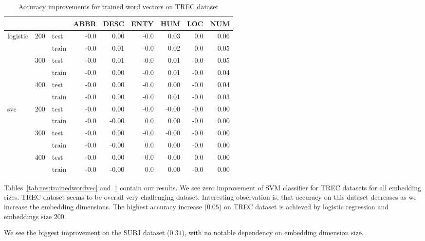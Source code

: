     \begin{table}[H]
    \begin{center}
    
    \begin{tabular}{lllrrrrrr}
    \toprule
     & &&ABBR &DESC &ENTY &HUM &LOC &NUM \\
    \midrule
    logistic & 200 & test &-0.0 &0.00 &-0.0 & 0.03 &0.0 & 0.06 \\
     & & train &-0.0 &0.01 &-0.0 & 0.02 &0.0 & 0.05 \\
     & 300 & test &-0.0 &0.01 &-0.0 & 0.01 & -0.0 & 0.05 \\
     & & train &-0.0 &0.00 &-0.0 & 0.01 & -0.0 & 0.04 \\
     & 400 & test &-0.0 &0.00 &-0.0 & 0.00 & -0.0 & 0.04 \\
     & & train &-0.0 &0.00 &-0.0 & 0.01 & -0.0 & 0.03 \\
    svc & 200 & test &-0.0 &0.00 &-0.0 &-0.00 & -0.0 & 0.00 \\
     & & train &-0.0 & -0.00 & 0.0 & 0.00 & -0.0 & 0.00 \\
     & 300 & test &-0.0 &0.00 &-0.0 &-0.00 & -0.0 & 0.00 \\
     & & train &-0.0 & -0.00 & 0.0 & 0.00 & -0.0 & 0.00 \\
     & 400 & test &-0.0 &0.00 &-0.0 &-0.00 & -0.0 & 0.00 \\
     & & train &-0.0 & -0.00 & 0.0 & 0.00 & -0.0 & 0.00 \\
    \bottomrule
    \end{tabular}
    
    \caption[Accuracy improvements for trained word vectors on TREC dataset]{Accuracy improvements for trained word vectors on TREC dataset}
    \label{tab:res:trainedwordvec:trec}
    \end{center}
    \end{table}


    Tables~\ref{tab:res:trainedwordvec} and~\ref{tab:res:trainedwordvec:trec} contain our results.
    We see zero improvement of SVM classifier for TREC datasets for all embedding sizes.
    TREC dataset seems to be overall very challenging dataset.
    Interesting observation is, that accuracy on this dataset decreases as we increase the embedding dimensions.
    The highest accuracy increase ($0.05$) on TREC dataset is achieved by logistic regression and embeddings size $200$. 
    
    We see the biggest improvement on the SUBJ dataset ($0.31$), with no notable dependency on embedding dimension size.  
    
